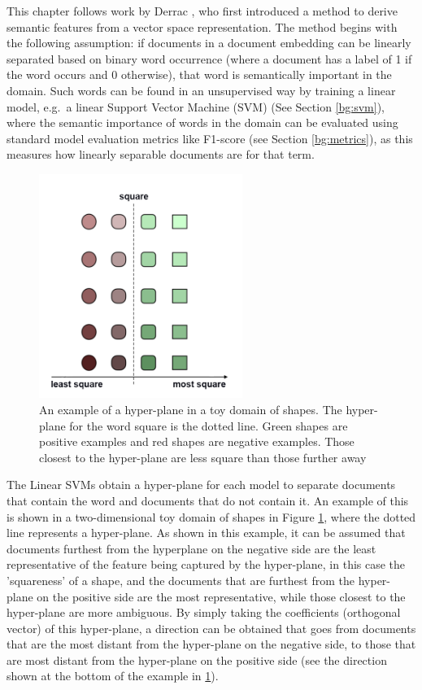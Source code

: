 This chapter follows work by Derrac \cite{Derrac2015}, who first introduced a method to derive semantic features from a vector space representation. The method begins with the following assumption: if documents in a document embedding  can be linearly separated based on binary word occurrence (where a document has a label of 1 if the word occurs and 0 otherwise), that word is semantically important in the domain. Such words can be found in an unsupervised way by training a linear model, e.g.\ a linear Support Vector Machine (SVM) (See Section \ref{bg:svm}), where the semantic importance of words  in the domain can be evaluated using standard model evaluation metrics like F1-score (see Section \ref{bg:metrics}), as this measures how linearly separable documents are for that term.

\begin{figure}[t]
	\includegraphics[width=250px]{images/Toyhyperplane1Direction.png}
	\centering
	\caption{An example of a hyper-plane in a toy domain of shapes. The hyper-plane for the word square is the dotted line. Green shapes are positive examples and red shapes are negative examples. Those closest to the hyper-plane are less square than those further away}\label{ch3:HyperPlaneNoDir}
\end{figure}

The Linear SVMs obtain a hyper-plane for each model to  separate documents that contain the word and documents that do not contain it. An  example of this is shown in a two-dimensional toy domain of shapes in Figure \ref{ch3:HyperPlaneNoDir}, where the dotted line represents a hyper-plane. As shown in this example, it can be assumed that documents furthest from the hyperplane on the negative side are the least representative of the feature being captured by the hyper-plane, in this case the 'squareness' of a shape, and the documents that are furthest from the hyper-plane on the positive side are the most representative, while those closest to the hyper-plane are more ambiguous. By simply taking the coefficients (orthogonal vector) of this hyper-plane, a direction can be obtained  that goes from documents that are the most distant from the hyper-plane on the negative side, to those that are most distant from the hyper-plane on the positive side (see the direction shown at the bottom of the example in \ref{ch3:HyperPlaneNoDir}).

